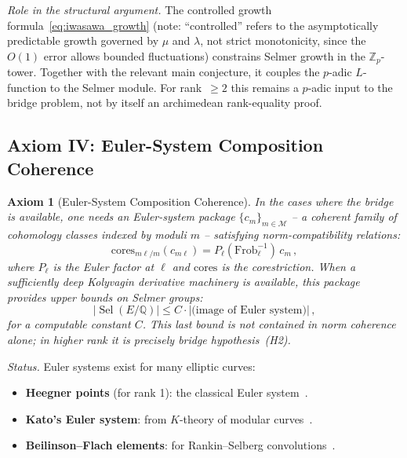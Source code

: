 \documentclass[aps,prd,twocolumn,superscriptaddress,nofootinbib,floatfix]{revtex4-2}
\newtheorem{axiom}[theorem]{Axiom}
\theoremstyle{definition}
\theoremstyle{remark}
\DeclareMathOperator{\Sel}{Sel}
\begin{document}
\textit{Role in the structural argument.} The controlled growth formula~\eqref{eq:iwasawa_growth} (note: ``controlled'' refers to the asymptotically predictable growth governed by $\mu$ and $\lambda$, not strict monotonicity, since the $O(1)$ error allows bounded fluctuations) constrains Selmer growth in the $\mathbb{Z}_p$-tower. Together with the relevant main conjecture, it couples the $p$-adic $L$-function to the Selmer module. For rank~$\geq 2$ this remains a $p$-adic input to the bridge problem, not by itself an archimedean rank-equality proof.

\subsection{Axiom IV: Euler-System Composition Coherence}

\begin{axiom}[Euler-System Composition Coherence]
\label{ax:euler}
In the cases where the bridge is available, one needs an Euler-system package $\{c_m\}_{m \in \mathcal{M}}$ -- a coherent family of cohomology classes indexed by moduli $m$ -- satisfying norm-compatibility relations:
\begin{equation}
\mathrm{cores}_{m\ell/m}(c_{m\ell}) = P_\ell(\mathrm{Frob}_\ell^{-1})\, c_m\,,
\label{eq:euler_norm}
\end{equation}
where $P_\ell$ is the Euler factor at $\ell$ and $\mathrm{cores}$ is the corestriction. When a sufficiently deep Kolyvagin derivative machinery is available, this package provides upper bounds on Selmer groups:
\begin{equation}
|\Sel(E/\mathbb{Q})| \leq C \cdot |\text{(image of Euler system)}|\,,
\end{equation}
for a computable constant $C$. This last bound is not contained in norm coherence alone; in higher rank it is precisely bridge hypothesis~(H2).
\end{axiom}

\textit{Status.} Euler systems exist for many elliptic curves:
\begin{itemize}
\item \textbf{Heegner points} (for rank 1): the classical Euler system~\cite{Kolyvagin1990}.
\item \textbf{Kato's Euler system}: from $K$-theory of modular curves~\cite{Kato2004}.
\item \textbf{Beilinson--Flach elements}: for Rankin--Selberg convolutions~\cite{LLZ2014}.
\end{itemize}
\end{document}
